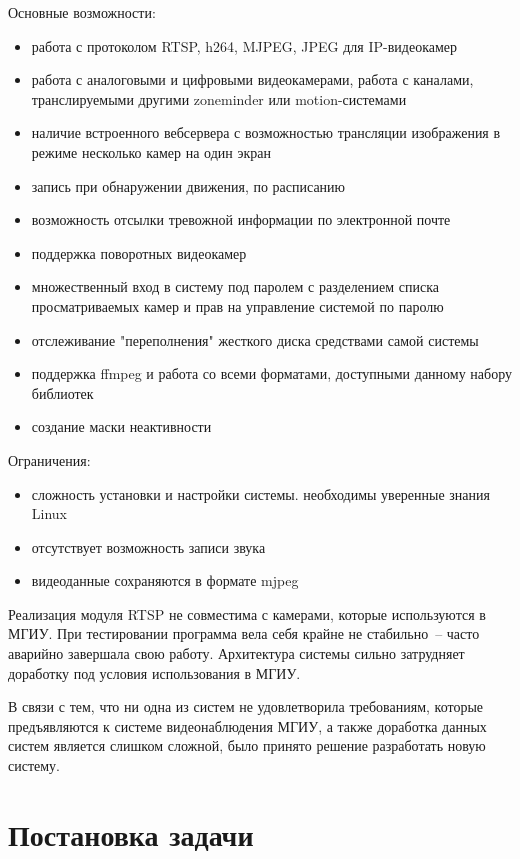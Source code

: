 Основные возможности:
\smallskip
\begin{itemize}
	\item
	работа с протоколом RTSP, h264, MJPEG, JPEG для IP-видеокамер
	\item
	работа с аналоговыми и цифровыми видеокамерами, работа с каналами,
	транслируемыми другими zoneminder или motion-системами
	\item
	наличие встроенного вебсервера с возможностью трансляции изображения
	в режиме несколько камер на один экран
	\item
	запись при обнаружении движения, по расписанию
	\item
	возможность отсылки тревожной информации по электронной почте
	\item
	поддержка поворотных видеокамер
	\item
	множественный вход в систему под паролем с разделением списка просматриваемых камер
	и прав на управление системой по паролю
	\item
	отслеживание "переполнения" жесткого диска средствами самой системы
	\item
	поддержка ffmpeg и работа со всеми форматами, доступными данному набору библиотек
	\item
	создание маски неактивности
\end{itemize}

\medskip

Ограничения:
\smallskip
\begin{itemize}
	\item сложность установки и настройки системы. необходимы уверенные знания Linux
	\item отсутствует возможность записи звука
	\item видеоданные сохраняются в формате mjpeg
\end{itemize}

\medskip

Реализация модуля RTSP не совместима с камерами, которые используются в МГИУ. При тестировании
программа вела себя крайне не стабильно~-- часто аварийно завершала свою работу.
Архитектура системы сильно затрудняет доработку под условия использования в МГИУ.

\medskip

В связи с тем, что ни одна из систем не удовлетворила требованиям, которые предъявляются к системе
видеонаблюдения МГИУ, а также доработка данных систем является слишком сложной, было принято
решение разработать новую систему.


\section{Постановка задачи}

